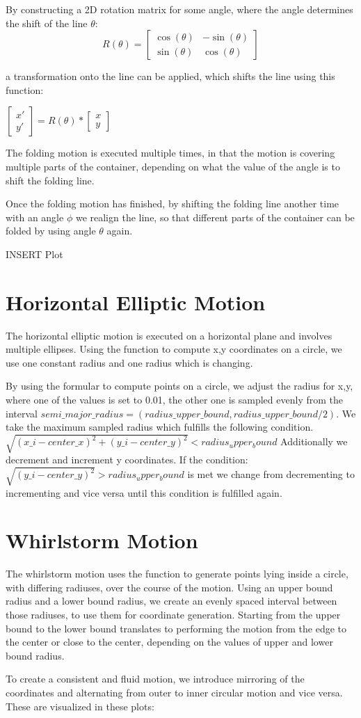By constructing a 2D rotation matrix for some angle, where the angle determines the shift of the line $\theta$:
\[R(\theta) = \begin{bmatrix}
    \cos(\theta) & -\sin(\theta) \\
    \sin(\theta) & \cos(\theta)
     \end{bmatrix}
 \] 

a transformation onto the line can be applied, which shifts the line using this function: 

$\begin{bmatrix} x' \\ y' \end{bmatrix} = R(\theta) * \begin{bmatrix} x \\ y \end{bmatrix}$

The folding motion is executed multiple times, in that the motion is covering multiple parts of the container, depending on what 
the value of the angle is to shift the folding line. 

Once the folding motion has finished, by shifting the folding line another time with an angle $\phi$
we realign the line, so that different parts of the container can be folded by using angle $\theta$ again.

INSERT Plot

\section{Horizontal Elliptic Motion}
The horizontal elliptic motion is executed on a horizontal plane and involves multiple ellipses.
Using the function to compute x,y coordinates on a circle, we use one constant radius and one radius which is changing. 

By using the formular to compute points on a circle, we adjust the radius for 
x,y, where one of the values is set to 0.01, the other one is sampled evenly from the interval $semi\_major\_radius = (radius\_upper\_bound,radius\_upper\_bound / 2 ).$
We take the maximum sampled radius which fulfills the following condition. 
$\sqrt{(x\_{i} - center\_x)^2 + (y\_{i} - center\_y)^2} < radius_upper_bound$
Additionally we decrement and increment y coordinates. If the condition: $\sqrt{(y\_{i} - center\_y)^2} > radius_upper_bound$
is met we change from decrementing to incrementing and vice versa until this condition is fulfilled again.

\section{Whirlstorm Motion}
The whirlstorm motion uses the function to generate points lying inside a circle, with differing radiuses, over the course of the motion. 
Using an upper bound radius and a lower bound radius, we create an evenly spaced interval between those radiuses, to use them for coordinate generation. 
Starting from the upper bound to the lower bound translates to performing the motion from the edge to the center or close to the center, depending on the 
values of upper and lower bound radius. 

To create a consistent and fluid motion, we introduce mirroring of the coordinates and alternating from outer to inner circular motion and vice versa.
These are visualized in these plots:


